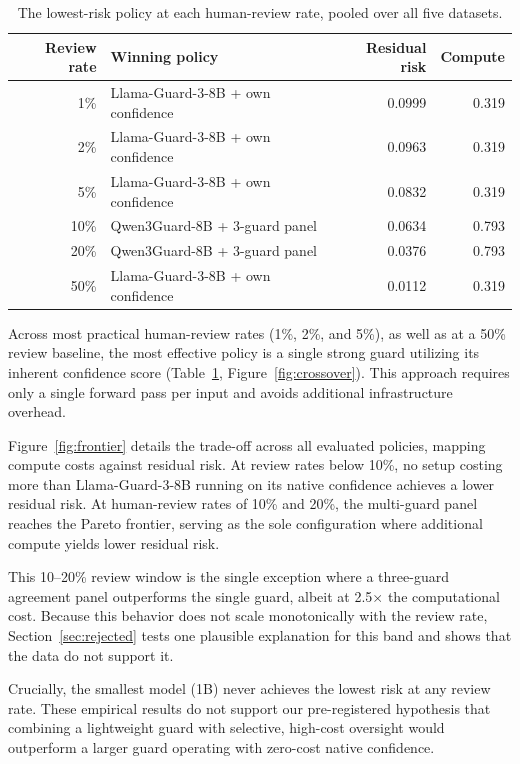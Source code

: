 \documentclass[11pt]{article}
\begin{document}
\begin{table}[ht]
\centering
\small
\caption{The lowest-risk policy at each human-review rate, pooled over all five datasets.}
\label{tab:winners}
\begin{tabular}{rlrr}
\toprule
Review rate & Winning policy & Residual risk & Compute \\
\midrule
1\% & Llama-Guard-3-8B + own confidence & 0.0999 & 0.319 \\
2\% & Llama-Guard-3-8B + own confidence & 0.0963 & 0.319 \\
5\% & Llama-Guard-3-8B + own confidence & 0.0832 & 0.319 \\
10\% & Qwen3Guard-8B + 3-guard panel & 0.0634 & 0.793 \\
20\% & Qwen3Guard-8B + 3-guard panel & 0.0376 & 0.793 \\
50\% & Llama-Guard-3-8B + own confidence & 0.0112 & 0.319 \\
\bottomrule
\end{tabular}
\end{table}

Across most practical human-review rates (1\%, 2\%, and 5\%), as well as at a 50\% review baseline, the most effective policy is a single strong guard utilizing its inherent confidence score (Table~\ref{tab:winners}, Figure~\ref{fig:crossover}). This approach requires only a single forward pass per input and avoids additional infrastructure overhead.

Figure~\ref{fig:frontier} details the trade-off across all evaluated policies, mapping compute costs against residual risk. At review rates below 10\%, no setup costing more than Llama-Guard-3-8B running on its native confidence achieves a lower residual risk. At human-review rates of 10\% and 20\%, the multi-guard panel reaches the Pareto frontier, serving as the sole configuration where additional compute yields lower residual risk.

This 10--20\% review window is the single exception where a three-guard agreement panel outperforms the single guard, albeit at 2.5$\times$ the computational cost. Because this behavior does not scale monotonically with the review rate, Section~\ref{sec:rejected} tests one plausible explanation for this band and shows that the data do not support it.

Crucially, the smallest model (1B) never achieves the lowest risk at any review rate. These empirical results do not support our pre-registered hypothesis that combining a lightweight guard with selective, high-cost oversight would outperform a larger guard operating with zero-cost native confidence.
\end{document}
